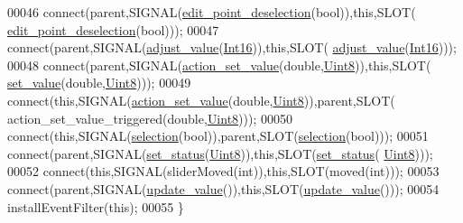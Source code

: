 \begin{DoxyCode}
00046     connect(parent,SIGNAL(\hyperlink{a00077_a105dff1f3ae7cfdcfabacd013428a501}{edit\_point\_deselection}(\textcolor{keywordtype}{bool})),\textcolor{keyword}{this},SLOT(
      \hyperlink{a00077_a105dff1f3ae7cfdcfabacd013428a501}{edit\_point\_deselection}(\textcolor{keywordtype}{bool})));
00047     connect(parent,SIGNAL(\hyperlink{a00077_a521ac5143857dd652a0bafa77389fa81}{adjust\_value}(\hyperlink{a00004_a3985266aecb120f269789241c170850c}{Int16})),\textcolor{keyword}{this},SLOT(
      \hyperlink{a00077_a521ac5143857dd652a0bafa77389fa81}{adjust\_value}(\hyperlink{a00004_a3985266aecb120f269789241c170850c}{Int16})));
00048     connect(parent,SIGNAL(\hyperlink{a00077_a886f07f2c612121bec703581f9398a10}{action\_set\_value}(\textcolor{keywordtype}{double},\hyperlink{a00004_a979e3e23b9a449e69ab6a8a83b6042f8}{Uint8})),\textcolor{keyword}{this},SLOT(
      \hyperlink{a00077_ae3010d3de02715db2f443560d7d2a27b}{set\_value}(\textcolor{keywordtype}{double},\hyperlink{a00004_a979e3e23b9a449e69ab6a8a83b6042f8}{Uint8})));
00049     connect(\textcolor{keyword}{this},SIGNAL(\hyperlink{a00077_a886f07f2c612121bec703581f9398a10}{action\_set\_value}(\textcolor{keywordtype}{double},\hyperlink{a00004_a979e3e23b9a449e69ab6a8a83b6042f8}{Uint8})),parent,SLOT(
      action\_set\_value\_triggered(\textcolor{keywordtype}{double},\hyperlink{a00004_a979e3e23b9a449e69ab6a8a83b6042f8}{Uint8})));
00050     connect(\textcolor{keyword}{this},SIGNAL(\hyperlink{a00077_a66bf875d43a16cf37527ab75c439fd8e}{selection}(\textcolor{keywordtype}{bool})),parent,SLOT(\hyperlink{a00077_a66bf875d43a16cf37527ab75c439fd8e}{selection}(\textcolor{keywordtype}{bool})));
00051     connect(parent,SIGNAL(\hyperlink{a00077_a567902754e43310fe921b74c9d1862dd}{set\_status}(\hyperlink{a00004_a979e3e23b9a449e69ab6a8a83b6042f8}{Uint8})),\textcolor{keyword}{this},SLOT(\hyperlink{a00077_a567902754e43310fe921b74c9d1862dd}{set\_status}(
      \hyperlink{a00004_a979e3e23b9a449e69ab6a8a83b6042f8}{Uint8})));
00052     connect(\textcolor{keyword}{this},SIGNAL(sliderMoved(\textcolor{keywordtype}{int})),\textcolor{keyword}{this},SLOT(moved(\textcolor{keywordtype}{int})));
00053     connect(parent,SIGNAL(\hyperlink{a00077_a4f62a01554ee8d975abe0cb136937695}{update\_value}()),\textcolor{keyword}{this},SLOT(\hyperlink{a00077_a4f62a01554ee8d975abe0cb136937695}{update\_value}()));
00054     installEventFilter(\textcolor{keyword}{this});
00055 \}
\end{DoxyCode}


